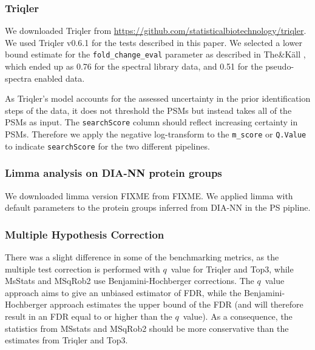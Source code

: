 \documentclass[10pt,letterpaper]{article}
\begin{document}
\subsubsection*{Triqler}

We downloaded Triqler from \url{https://github.com/statisticalbiotechnology/triqler}. We used Triqler v0.6.1 for the tests described in this paper. We selected a lower bound estimate for the \texttt{fold\_change\_eval} parameter as described in The\&K\"{a}ll \cite{the2021triqler}, which ended up as 0.76 for the spectral library data, and 0.51 for the pseudo-spectra enabled data.

As Triqler's model accounts for the assessed uncertainty in the prior identification steps of the data, it does not threshold the PSMs but instead takes all of the PSMs as input. The \texttt{searchScore} column should reflect increasing certainty in PSMs. Therefore we apply the negative log-transform to the \texttt{m\_score} or \texttt{Q.Value} to indicate \texttt{searchScore} for the two different pipelines. 

\subsubsection*{Limma analysis on DIA-NN protein groups}

We downloaded limma\cite{limma} version FIXME from FIXME. We applied limma with default parameters to the protein groups inferred from DIA-NN in the PS pipline.  

\subsubsection*{Multiple Hypothesis Correction}
There was a slight difference in some of the benchmarking metrics, as the multiple test correction is performed with $q$~value for Triqler and Top3, while MsStats and MSqRob2 use Benjamini-Hochberger \cite{benjamini1995controlling} corrections. The $q$~value approach aims to give an unbiased estimator of FDR, while the Benjamini-Hochberger approach estimates the upper bound of the FDR (and will therefore result in an FDR equal to or higher than the $q$~value). As a consequence, the statistics from MSstats and MSqRob2 should be more conservative than the estimates from Triqler and Top3\cite{korthauer2019practical}.

\end{document}
